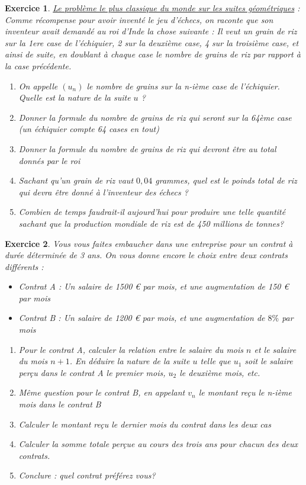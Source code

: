 \documentclass[10pt,a4paper]{article}
\newtheorem{exo}{Exercice}
\begin{document}
\begin{exo}
    \underline{Le problème le plus classique du monde sur les suites géométriques} : Comme récompense pour avoir inventé le jeu d'échecs, on raconte que son inventeur avait demandé au roi d'Inde la chose suivante : Il veut un grain de riz sur la 1ere case de l'échiquier, 2 sur la deuxième case, 4 sur la troisième case, et ainsi de suite, en doublant à chaque case le nombre de grains de riz par rapport à la case précédente.  \begin{enumerate}
        \item On appelle $(u_n)$ le nombre de grains sur la n-ième case de l'échiquier.  Quelle est la nature de la suite $u$ ?
        \item Donner la formule du nombre de grains de riz qui seront sur la 64ème case (un échiquier compte 64 cases en tout)
        \item Donner la formule du nombre de grains de riz qui devront être au total donnés par le roi
        \item Sachant qu'un grain de riz vaut $0{,}04$ grammes, quel est le poinds total de riz qui devra être donné à l'inventeur des échecs ? 
        \item Combien de temps faudrait-il aujourd'hui pour produire une telle quantité sachant que la production mondiale de riz est de 450 millions de tonnes?
    \end{enumerate}
\end{exo}


\begin{exo}
    Vous vous faites embaucher dans une entreprise pour un contrat à durée déterminée de 3 ans. On vous donne encore le choix entre deux contrats différents : 
    \begin{itemize}
        \item Contrat A : Un salaire de 1500 € par mois, et une augmentation de 150 € par mois
        \item Contrat B : Un salaire de 1200 € par mois, et une augmentation de $8\%$ par mois 
    \end{itemize}
    
    
    \begin{enumerate}
        \item Pour le contrat A, calculer la relation entre le salaire du mois $n$ et le salaire du mois $n+1$. En déduire la nature de la suite $u$ telle que $u_1$ soit le salaire perçu dans le contrat A le premier mois, $u_2$ le deuxième mois, etc.
        \item Même question pour le contrat B, en appelant $v_n$ le montant reçu le n-ième mois dans le contrat B
        \item Calculer le montant reçu le dernier mois du contrat dans les deux cas
        \item Calculer la somme totale perçue au cours des trois ans pour chacun des deux contrats. 
        \item Conclure : quel contrat préférez vous?
    \end{enumerate}
\end{exo}
\end{document}
